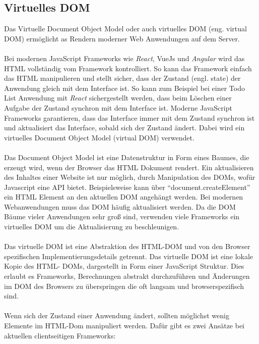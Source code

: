 \documentclass[runningheads]{llncs}
\numberwithin{figure}{section}
\begin{document}
\subsection{Virtuelles DOM}
\label{subsec:Virtuelles DOM}
Das Virtuelle Document Object Model
oder auch virtuelles DOM (eng. virtual DOM) ermöglicht 
as Rendern moderner Web Anwendungen auf dem Server.
\\
\\
Bei modernen JavaScript Frameworks wie \textit{React}, 
VueJs und \textit{Angular} wird das HTML vollständig vom Framework kontrolliert. 
So kann das Framework einfach das HTML manipulieren und stellt sicher, 
dass der Zustand (engl. state) der Anwendung gleich mit dem Interface ist. 
So kann zum Beispiel bei einer Todo List Anwendung mit \textit{React} sichergestellt werden, 
dass beim Löschen einer Aufgabe der Zustand synchron mit dem Interface ist. 
Moderne JavaScript Frameworks garantieren, 
dass das Interface immer mit dem Zustand synchron ist und aktualisiert das Interface, 
sobald sich der Zustand ändert. 
Dabei wird ein virtuelles Document Object Model (virtual DOM) verwendet.
\\
\\
Das Document Object Model ist eine Datenstruktur in Form eines Baumes, 
die erzeugt wird, wenn der Browser das HTML Dokument rendert. 
Ein aktualisieren des Inhaltes einer Website ist nur möglich, 
durch Manipulation des DOMs, wofür Javascript eine API bietet. 
Beispielsweise kann über “document.createElement” ein HTML Element 
an den aktuellen DOM angehängt werden. 
Bei modernen Webanwendungen muss das DOM häufig aktualisiert werden. 
Da die DOM Bäume vieler Anwendungen sehr groß sind, 
verwenden viele Frameworks ein virtuelles DOM um die 
Aktualisierung zu beschleunigen. 
\\
\\
Das virtuelle DOM ist eine Abstraktion des HTML-DOM und 
von den Browser spezifischen Implementierungsdetails getrennt. 
Das virtuelle DOM ist eine lokale Kopie des HTML- DOMs, 
dargestellt in Form einer JavaScript Struktur. 
Dies erlaubt es Frameworks, 
Berechnungen abstrakt durchzuführen und Änderungen im DOM des Browsers 
zu überspringen die oft langsam und browserspezifisch sind.
\\
\\
Wenn sich der Zustand einer Anwendung ändert, 
sollten möglichst wenig Elemente im HTML-Dom manipuliert werden. 
Dafür gibt es zwei Ansätze bei aktuellen clientseitigen Frameworks:
\end{document}
